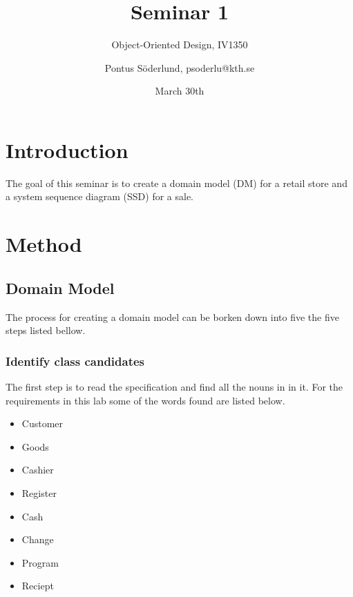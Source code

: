 \documentclass[a4paper]{scrreprt}
\title{Seminar 1}
\subtitle{Object-Oriented Design, IV1350}
\author{Pontus Söderlund, psoderlu@kth.se}
\date{March 30th}
\begin{document}
\maketitle

\tableofcontents %

\chapter{Introduction}
    The goal of this seminar is to create a domain model (DM) for a retail store
    and a system sequence diagram (SSD) for a sale.

\chapter{Method}
    
    \section{Domain Model}
        The process for creating a domain model can be borken down into five the 
        five steps listed bellow.

        \subsection{Identify class candidates}
            The first step is to read the specification and find all the nouns in
            in it. For the requirements in this lab some of the words found are
            listed below.

            \begin{itemize}
                \item Customer
                \item Goods
                \item Cashier
                \item Register
                \item Cash
                \item Change
                \item Program
                \item Reciept
            \end{itemize}
\end{document}
